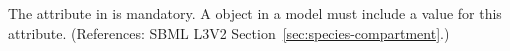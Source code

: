 The attribute  in \Species is mandatory.  A \Species
object in a model must include a value for this attribute.  (References:
SBML L3V2 Section~\ref{sec:species-compartment}.)
